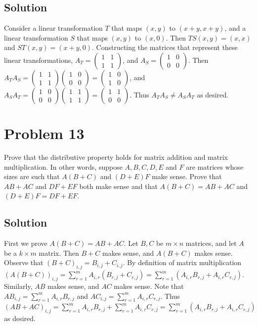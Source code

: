 \documentclass{article}
\begin{document}
\subsection*{Solution}
Consider a linear transformation $T$ that maps $(x, y)$ to $(x+y, x+y)$, and a linear transformation $S$ that maps $(x, y)$ to $(x,0)$. Then $TS(x,y)=(x,x)$ and $ST(x,y)=(x+y, 0)$. Constructing the matrices that represent these linear transformations, $A_T=\begin{pmatrix}
1 & 1 \\
1 & 1
\end{pmatrix}$, and $A_S=\begin{pmatrix}
1 & 0 \\
0 & 0
\end{pmatrix}$. Then $A_T A_S=\begin{pmatrix}
1 & 1 \\
1 & 1
\end{pmatrix}\begin{pmatrix}
1 & 0 \\
0 & 0
\end{pmatrix}=\begin{pmatrix}
1 & 0 \\
1 & 0
\end{pmatrix}$, and $A_S A_T=\begin{pmatrix}
1 & 0 \\
0 & 0
\end{pmatrix}\begin{pmatrix}
1 & 1 \\
1 & 1
\end{pmatrix}=\begin{pmatrix}
1 & 1 \\
0 & 0
\end{pmatrix}$. Thus $A_T A_S \neq A_S A_T$ as desired.

\section*{Problem 13}
Prove that the distributive property holds for matrix addition and matrix multiplication. In other words, suppose $A, B, C, D, E$ and $F$ are matrices whose sizes are such that $A(B+C)$ and $(D+E)F$ make sense. Prove that $AB+AC$ and $DF+EF$ both make sense and that $A(B+C)=AB+AC$ and $(D+E)F=DF+EF$.

\subsection*{Solution}
First we prove $A(B+C)=AB+AC$. Let $B, C$ be $m\times n$ matrices, and let $A$ be a $k\times m$ matrix. Then $B+C$ makes sense, and $A(B+C)$ makes sense. Observe that $(B+C)_{i,j}=B_{i,j}+C_{i,j}$. By definition of matrix multiplication $(A(B+C))_{i,j}=\sum_{r=1}^{m} A_{i,r} (B_{r,j} + C_{r,j})=\sum_{r=1}^{m} (A_{i,r} B_{r,j} + A_{i,r} C_{r,j})$. Similarly, $AB$ makes sense, and $AC$ makes sense. Note that $AB_{i,j}=\sum_{r=1}^{m} A_{i,r} B_{r,j}$ and $AC_{i,j}=\sum_{r=1}^{m} A_{i,r} C_{r,j}$. Thus $(AB+AC)_{i,j}=\sum_{r=1}^{m} A_{i,r} B_{r,j} + \sum_{r=1}^{m} A_{i,r} C_{r,j}=\sum_{r=1}^{m} (A_{i,r} B_{r,j} + A_{i,r} C_{r,j})$ as desired.
\end{document}
